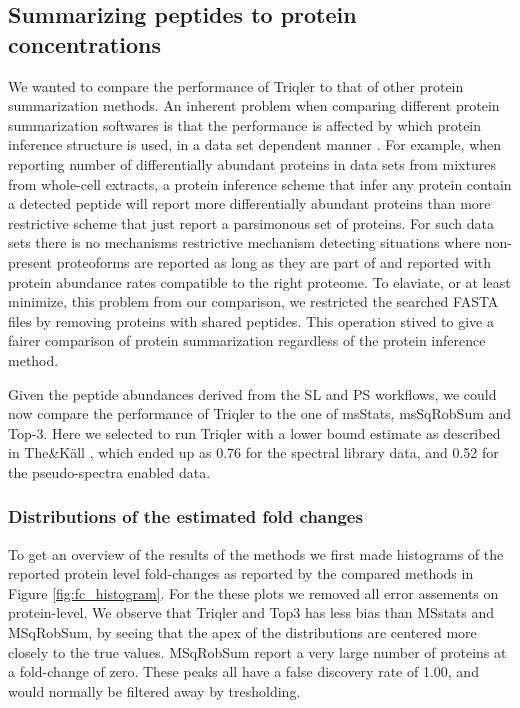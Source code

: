 \documentclass[10pt,letterpaper]{article}
\begin{document}
\subsection*{Summarizing peptides to protein concentrations}

We wanted to compare the performance of Triqler to that of other protein summarization methods. An inherent problem when comparing different protein summarization softwares is that the performance is affected by which protein inference structure is used, in a data set dependent manner \cite{serang2012recognizing}. For example, when reporting number of differentially abundant proteins in data sets from mixtures from whole-cell extracts, a protein inference scheme that infer any protein contain a detected peptide will report more differentially abundant proteins than more restrictive scheme that just report a parsimonous set of proteins. For such data sets there is no mechanisms restrictive mechanism detecting situations where non-present proteoforms are reported as long as they are part of and reported with protein abundance rates compatible to the right proteome. To elaviate, or at least minimize, this problem from our comparison, we restricted the searched FASTA files by removing proteins with shared peptides. This operation stived to 
give a fairer comparison of protein summarization regardless of the protein inference method.

Given the peptide abundances derived from the SL and PS workflows, we could now compare the performance of Triqler to the one of msStats, msSqRobSum and Top-3. Here we selected to run Triqler with a lower bound estimate as described in The\&K\"{a}ll \cite{the2021triqler}, which ended up as 0.76 for the spectral library data, and 0.52 for the pseudo-spectra enabled data.

\subsubsection*{Distributions of the estimated fold changes}

To get an overview of the results of the methods we first made histograms of the reported protein level fold-changes as reported by the compared methods in Figure \ref{fig:fc_histogram}. For the these plots we removed all error assements on protein-level. We observe that Triqler and Top3 has less bias than MSstats and MSqRobSum, by seeing that the apex of the distributions are centered more closely to the true values. MSqRobSum report a very large number of proteins at a fold-change of zero. These peaks all have a false discovery rate of 1.00, and would normally be filtered away by tresholding.
\end{document}

